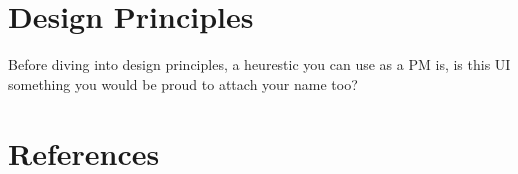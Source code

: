 \documentclass[
  letterpaper,
  DIV=11,
  numbers=noendperiod]{scrreprt}
\newlength{\cslhangindent}
\newlength{\cslentryspacingunit} %
\newenvironment{CSLReferences}[2] %
 {%
  \setlength{\parindent}{0pt}
  \ifodd #1
  \let\oldpar\par
  \def\par{\hangindent=\cslhangindent\oldpar}
  \fi
  \setlength{\parskip}{#2\cslentryspacingunit}
 }%
 {}
\begin{document}

\hypertarget{section-3}{%
\chapter{}\label{section-3}}


\hypertarget{design-principles}{%
\chapter{Design Principles}\label{design-principles}}

Before diving into design principles, a heurestic you can use as a PM
is, is this UI something you would be proud to attach your name too?


\hypertarget{section-4}{%
\chapter{}\label{section-4}}


\hypertarget{section-5}{%
\chapter{}\label{section-5}}


\hypertarget{section-6}{%
\chapter{}\label{section-6}}


\hypertarget{references}{%
\chapter*{References}\label{references}}


\hypertarget{refs}{}
\begin{CSLReferences}{0}{0}
\end{CSLReferences}
\end{document}
